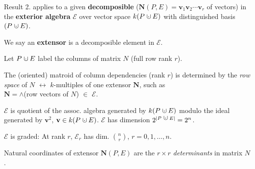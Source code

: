 \documentclass[%
  slidesonly,%
  semlayer,%
  amsmath
  ]{seminar}                                  %
\newcommand{\dunion}
{\mbox{\hbox{\hskip0.45em$\cdot$\hskip-0.44em$\cup$\hskip0.2em}}}
\begin{document}
\begin{slide}
Result 2. applies to a given
\textbf{decomposible}  
($\mathbf{N}(P,E)=\mathbf{v}_1\mathbf{v}_2\cdots\mathbf{v}_r$ of
vectors)
in the \textbf{exterior algebra} $\mathcal{E}$ over vector space
$k(P\dunion E)$ with distinguished basis $(P\dunion E)$.

We say an \textbf{extensor} is a decomposible element in $\mathcal{E}$.

Let $P\dunion E$ label the columns of matrix $N$ (full row rank $r$).


The (oriented) matroid of column dependencies (rank $r$) is determined by 
the \textit{row space} of $N$ \hspace{2em}$\leftrightarrow$ $k$-multiples of one extensor
$\mathbf{N}$, such as\\
$\mathbf{N}=\wedge$(row vectors of $N$)
$\in$ $\mathcal{E}$.

$\mathcal{E}$ is quotient of the assoc. algebra 
generated by $k(P\dunion E)$
modulo the ideal generated by $\mathbf{v}^2$, $\mathbf{v}\in k(P\dunion E)$.
$\mathcal{E}$ has dimension $2^{|P\dunion E|}=2^n$. 

$\mathcal{E}$ is graded: At rank $r$, $\mathcal{E}_r$ has 
dim. $\binom{n}{r}$, $r=0,1,\ldots,n$.

Natural coordinates of extensor $\textbf{N}(P,E)$ are the $r\times r$ 
\textit{determinants} in matrix $N$.

\end{slide}
\end{document}
